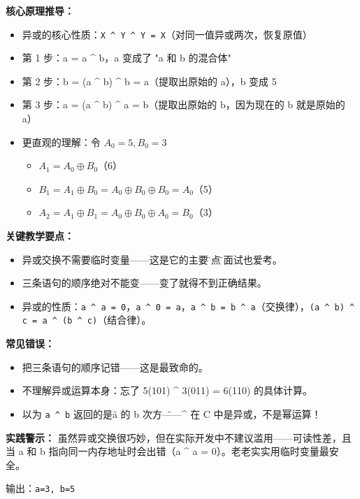 \smallskip
\textbf{核心原理推导：}
\begin{itemize}
    \item 异或的核心性质：\texttt{X \^{} Y \^{} Y = X}（对同一值异或两次，恢复原值）
    \item 第 1 步：a = a \^{} b，a 变成了 "a 和 b 的混合体"
    \item 第 2 步：b = (a \^{} b) \^{} b = a（提取出原始的 a），b 变成 5
    \item 第 3 步：a = (a \^{} b) \^{} a = b（提取出原始的 b，因为现在的 b 就是原始的 a）
    \item 更直观的理解：令 $A_0=5, B_0=3$
    \begin{itemize}
        \item $A_1 = A_0 \oplus B_0$（6）
        \item $B_1 = A_1 \oplus B_0 = A_0 \oplus B_0 \oplus B_0 = A_0$（5）\checkmark 
        \item $A_2 = A_1 \oplus B_1 = A_0 \oplus B_0 \oplus A_0 = B_0$（3）\checkmark
    \end{itemize}
\end{itemize}

\textbf{关键教学要点：}
\begin{itemize}
    \item 异或交换不需要临时变量——这是它的主要\"卖点\"，面试也爱考。
    \item 三条语句的顺序绝对不能变——变了就得不到正确结果。
    \item 异或的性质：\texttt{a \^{} a = 0}，\texttt{a \^{} 0 = a}，\texttt{a \^{} b = b \^{} a}（交换律），\texttt{(a \^{} b) \^{} c = a \^{} (b \^{} c)}（结合律）。
\end{itemize}

\textbf{常见错误：}
\begin{itemize}
    \item 把三条语句的顺序记错——这是最致命的。
    \item 不理解异或运算本身：忘了 5(101) \^{} 3(011) = 6(110) 的具体计算。
    \item 以为 \texttt{a \^{} b} 返回的是\"a 的 b 次方\"——\^{} 在 C 中是异或，不是幂运算！
\end{itemize}

\textbf{实践警示：} 虽然异或交换很巧妙，但在实际开发中不建议滥用——可读性差，且当 a 和 b 指向同一内存地址时会出错（a \^{} a = 0）。老老实实用临时变量最安全。

{\color{highlight}输出：\texttt{a=3, b=5}}
